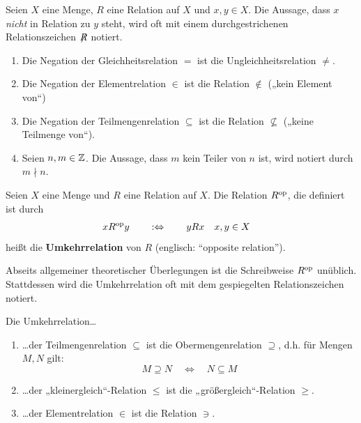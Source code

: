 \begin{nota}
    Seien $X$ eine Menge, $R$ eine Relation auf $X$ und $x,y\in X$. Die Aussage, dass $x$ \emph{nicht} in Relation zu $y$ steht, wird oft mit einem durchgestrichenen Relationszeichen $\not\mathrel{R}$ notiert.
\end{nota}


\begin{bsp} \quad
    \begin{enumerate}
        \item Die Negation der Gleichheitsrelation $=$ ist die Ungleichheitsrelation $\neq$.
        \item Die Negation der Elementrelation $\in$ ist die Relation $\notin$ („kein Element von“)
        \item Die Negation der Teilmengenrelation $\subseteq$ ist die Relation $\nsubseteq$ („keine Teilmenge von“).
        \item Seien $n,m\in \mathbb Z$. Die Aussage, dass $m$ kein Teiler von $n$ ist, wird notiert durch $m\nmid n$.
    \end{enumerate}
\end{bsp}


\begin{de}[Umkehrrelation] \label{def:umkehrrel} 
    Seien $X$ eine Menge und $R$ eine Relation auf $X$. Die Relation $R^{\mathrm{op}}$, die definiert ist durch
    \begin{align*}
        xR^{\mathrm{op}} y \qquad &:\Leftrightarrow\qquad yRx && x,y\in X
    \end{align*}
    heißt die \textbf{Umkehrrelation} von $R$ (englisch: ``opposite relation''). 
\end{de}


\begin{nota} \label{spiegelrel}
    Abseits allgemeiner theoretischer Überlegungen ist die Schreibweise $R^{\mathrm{op}}$ unüblich. Stattdessen wird die Umkehrrelation oft mit dem gespiegelten Relationszeichen  notiert.
\end{nota}


\begin{bsp}
    Die Umkehrrelation\dots
    \begin{enumerate}
        \item \dots der Teilmengenrelation $\subseteq$ ist die Obermengenrelation $\supseteq$, d.h. für Mengen $M,N$ gilt:
            \[M\supseteq N \quad\iff\quad N\subseteq M \]
        \item \dots der „kleinergleich“-Relation $\le$ ist die „größergleich“-Relation $\ge$.
        \item \dots der Elementrelation $\in$ ist die Relation $\ni$.
    \end{enumerate}
\end{bsp}


